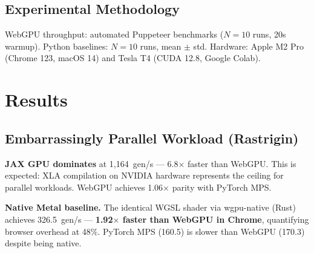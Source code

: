 \documentclass[sigconf,nonacm]{acmart}
\begin{document}
\subsection{Experimental Methodology}

WebGPU throughput: automated Puppeteer benchmarks ($N = 10$ runs, 20s warmup). Python baselines: $N = 10$ runs, mean $\pm$ std. Hardware: Apple M2 Pro (Chrome 123, macOS 14) and Tesla T4 (CUDA 12.8, Google Colab).

\section{Results}

\subsection{Embarrassingly Parallel Workload (Rastrigin)}

\begin{table}[h]
\caption{Rastrigin~\cite{rastrigin1974} Benchmark (POP=4,096, DIM=2,000)}
\label{tab:rastrigin}
\end{table}

\textbf{JAX GPU dominates} at 1,164~gen/s --- 6.8$\times$ faster than WebGPU. This is expected: XLA compilation on NVIDIA hardware represents the ceiling for parallel workloads. WebGPU achieves 1.06$\times$ parity with PyTorch MPS.

\textbf{Native Metal baseline.} The identical WGSL shader via wgpu-native (Rust) achieves 326.5~gen/s --- \textbf{1.92$\times$ faster than WebGPU in Chrome}, quantifying browser overhead at 48\%. PyTorch MPS (160.5) is slower than WebGPU (170.3) despite being native.
\end{document}
